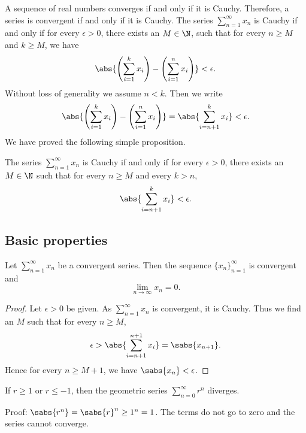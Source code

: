 A sequence of real numbers converges if and only if it is
Cauchy.  Therefore, a series is convergent if and only if it is Cauchy.
The series $\sum_{n=1}^\infty x_n$ is Cauchy if and only if for every $\epsilon > 0$,
there exists an $M \in \N$, such that for every $n \geq M$
and $k \geq M$, we have
\begin{equation*}
\abs{ \left( \sum_{i=1}^k x_i \right) - \left( \sum_{i=1}^n x_i \right) }
< \epsilon .
\end{equation*}
Without loss of generality we assume $n < k$.  Then we write
\begin{equation*}
\abs{ \left( \sum_{i=1}^k x_i \right) - \left( \sum_{i=1}^n x_i \right) }
=
\abs{ \sum_{i={n+1}}^k x_i }
< \epsilon .
\end{equation*}
We have proved the following simple proposition.

\begin{prop} \label{prop:cachyser}
The series $\sum_{n=1}^\infty x_n$ is Cauchy
if and only if for every $\epsilon > 0$, 
there exists an $M \in \N$ such that for every $n \geq M$
and every $k > n$,
\begin{equation*}
\abs{ \sum_{i={n+1}}^k x_i }
< \epsilon .
\end{equation*}
\end{prop}

\subsection{Basic properties}

\begin{prop}
Let $\sum_{n=1}^\infty x_n$ be a convergent series.  Then
the sequence $\{ x_n \}_{n=1}^\infty$ is convergent and
\begin{equation*}
\lim_{n\to\infty} x_n = 0.
\end{equation*}
\end{prop}

\begin{proof}
Let $\epsilon > 0$ be given.  As $\sum_{n=1}^\infty x_n$ is convergent, it is Cauchy.
Thus we find an $M$ such that for every $n \geq M$,
\begin{equation*}
\epsilon > 
\abs{ \sum_{i={n+1}}^{n+1} x_i }
=
\sabs{ x_{n+1} } .
\end{equation*}
Hence for every $n \geq M+1$, we have $\sabs{x_{n}} < \epsilon$.
\end{proof}

\begin{example}
If $r \geq 1$ or $r \leq -1$, then the geometric series $\sum_{n=0}^\infty r^n$
diverges.

Proof: $\sabs{r^n} = \sabs{r}^n \geq 1^n = 1$.  The terms do not go to zero
and the series cannot converge.
\end{example}

